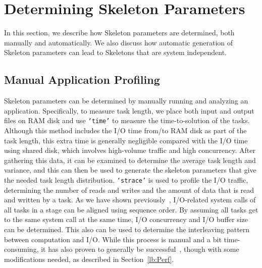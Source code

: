 \documentclass[preprint,12pt]{elsarticle}
\newcommand{\katznote}[1]{ {\textcolor{blue}    { ***Dan:   #1 }}}
\newcommand{\zhaonote}[1]{{\textcolor{darkgreen}{ ***Zhao:  #1 }}}
\newcommand{\katznote}[1]{}
\newcommand{\zhaonote}[1]{}
\newcommand{\T}[1]{\texttt{#1}\xspace}
\begin{document}
%

\section{Determining Skeleton Parameters}
\label{lb:Params}

In this section, we describe how Skeleton parameters are determined, both manually and
automatically.  We also discuss how automatic generation of Skeleton parameters can lead
to Skeletons that are system independent.

\subsection{Manual Application Profiling}
\label{sec:manual-profiling}

Skeleton parameters can be determined by manually running and analyzing an application.
Specifically, to measure task length, we place both input
and output files on RAM disk and use \T{`time'} to measure the time-to-solution of the tasks.
Although this method includes the I/O
time from/to RAM disk as part of the task length, this extra time is generally negligible
compared with the I/O time using shared disk, which involves
high-volume traffic and high concurrency.
After gathering this data, it can be examined to determine
the average task length and variance, and this can then be used to generate the skeleton
parameters that give the needed task length distribution.
\T{`strace'} is used to profile the I/O traffic, determining the number of reads and writes
and the amount of data
that is read and written by a task.
As we have shown previously~\cite{ENVELOPE}, I/O-related system calls
of all tasks in a stage can be aligned using sequence order. By assuming all tasks get to the
same system call at the same time, I/O concurrency and I/O buffer size can be determined.
This also can be used to determine the interleaving pattern between computation and I/O.  
While this process is manual and a bit time-consuming, it
has also proven to generally be successful~\cite{Skeleton2014}, though with some modifications needed, as described in Section~\ref{lb:Perf}.
\end{document}
